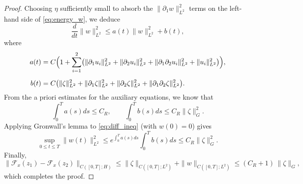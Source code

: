 \documentclass[10pt,a4paper]{amsart}
\begin{document}
\begin{proof}
  Choosing $\eta$ sufficiently small to absorb the $\|\partial_1 w\|_{L^2}^2$
  terms on the left-hand side of \eqref{eq:energy_w}, we deduce
  \begin{equation}\label{eq:diff_ineq}
    \frac{d}{dt}\|w\|_{L^2}^2 \le a(t) \|w\|_{L^2}^2 + b(t),
  \end{equation}
  where
  \begin{align*}
    a(t) &= C\Bigl(1+\sum_{i=1}^2\bigl(\|\partial_1 u_i\|_{L^2}^2
          +\|\partial_2 u_i\|_{L^2}^2+\|\partial_1\partial_2 u_i\|_{L^2}^2
          +\|u_i\|_{L^2}^2\bigr)\Bigr),\\[2mm]
    b(t) &= C\bigl(\|\zeta\|_{L^2}^2 + \|\partial_1\zeta\|_{L^2}^2
          + \|\partial_2\zeta\|_{L^2}^2 + \|\partial_1\partial_2\zeta\|_{L^2}^2\bigr).
  \end{align*}
  From the a priori estimates for the auxiliary equations, we know that
  \[
    \int_0^T a(s)ds \le C_R, \qquad
    \int_0^T b(s)ds \le C_R \|\zeta\|_G^2 .
  \]
  Applying Gronwall's lemma to \eqref{eq:diff_ineq} (with $w(0)=0$) gives
  \[
    \sup_{0\le t\le T}\|w(t)\|_{L^2}^2 \le e^{\int_0^T a(s)ds} \int_0^T b(s)ds
    \le C_R \|\zeta\|_G^2 .
  \]
  Finally,
  \[
    \|\mathcal F_x(z_1)-\mathcal F_x(z_2)\|_{C([0,T];H)}
    \le \|\zeta\|_{C([0,T];L^2)} + \|w\|_{C([0,T];L^2)}
    \le (C_R+1)\,\|\zeta\|_G,
  \]
  which completes the proof.
\end{proof}
\end{document}
